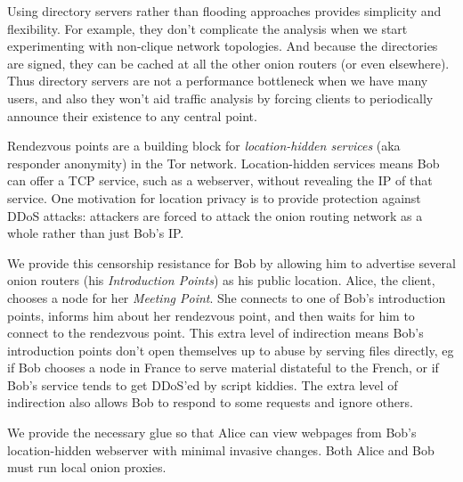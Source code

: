 \documentclass[times,10pt,twocolumn]{article}
\begin{document}
Using directory servers rather than flooding approaches provides
simplicity and flexibility. For example, they don't complicate
the analysis when we start experimenting with non-clique network
topologies. And because the directories are signed, they can be cached at
all the other onion routers (or even elsewhere). Thus directory servers
are not a performance bottleneck when we have many users, and also they
won't aid traffic analysis by forcing clients to periodically announce
their existence to any central point.

\label{sec:rendezvous}

Rendezvous points are a building block for \emph{location-hidden services}
(aka responder anonymity) in the Tor network. Location-hidden services
means Bob can offer a TCP service, such as a webserver, without revealing
the IP of that service. One motivation for location privacy is to provide
protection against DDoS attacks: attackers are forced to attack the
onion routing network as a whole rather than just Bob's IP.

We provide this censorship resistance for Bob by allowing him to
advertise several onion routers (his \emph{Introduction Points}) as his
public location. Alice, the client, chooses a node for her \emph{Meeting
Point}. She connects to one of Bob's introduction points, informs him
about her rendezvous point, and then waits for him to connect to the
rendezvous
point. This extra level of indirection means Bob's introduction points
don't open themselves up to abuse by serving files directly, eg if Bob
chooses a node in France to serve material distateful to the French,
%
%
or if Bob's service tends to get DDoS'ed by script kiddies.
The extra level of indirection also allows Bob to respond to some requests
and ignore others.

We provide the necessary glue so that Alice can view webpages from Bob's
location-hidden webserver with minimal invasive changes. Both Alice and
Bob must run local onion proxies.
\end{document}
